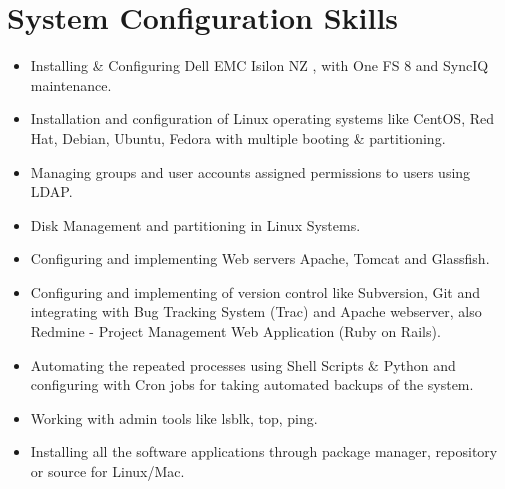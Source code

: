 \documentclass[11pt,a4paper,sans]{moderncv}        %
\begin{document}
\section{System Configuration Skills}
\begin{itemize}
\item Installing \& Configuring Dell EMC Isilon NZ , with One FS 8 and SyncIQ maintenance.
\item Installation and configuration of Linux operating systems like CentOS, Red Hat, Debian, Ubuntu, Fedora with multiple booting \& partitioning.
\item Managing groups and user accounts assigned permissions to users using LDAP.
\item Disk Management and partitioning in Linux Systems.
\item Configuring and implementing Web servers Apache, Tomcat and Glassfish.
\item Configuring and implementing of version control like Subversion, Git and integrating with Bug Tracking System (Trac) and Apache webserver, also Redmine - Project Management Web Application (Ruby on Rails).
\item Automating the repeated processes using Shell Scripts $\&$ Python and configuring with Cron jobs for taking automated backups of the system.
\item Working with admin tools like lsblk, top, ping.
\item Installing all the software applications through package manager, repository or source for Linux/Mac.
\end{itemize}
\pagebreak
~\\
\end{document}
